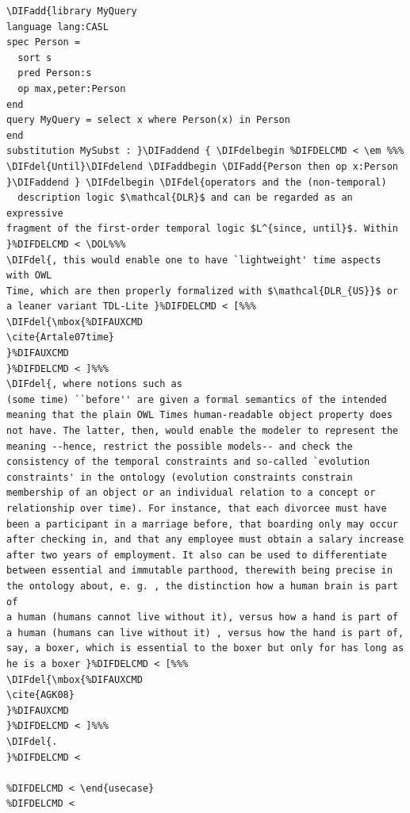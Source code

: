 \documentclass[10pt,fleqn,final]{scrreprt}
\newcommand*{\DOL}{\ensuremath{\mathsf{DOL}}\xspace}
\providecommand{\DIFadd}[1]{{\protect\color{blue}\uwave{#1}}} %
\providecommand{\DIFdel}[1]{{\protect\color{red}\sout{#1}}}                      %
\providecommand{\DIFaddbegin}{} %
\providecommand{\DIFaddend}{} %
\providecommand{\DIFdelbegin}{} %
\providecommand{\DIFdelend}{} %
\begin{document}
\begin{lstlisting}[basicstyle=\ttfamily,language=dolText,alsolanguage=CASL,escapechar=@,mathescape]
%DIF > prefix( lang:  <http://purl.net/DOL/languages/> )%
\DIFadd{library MyQuery
language lang:CASL
spec Person =
  sort s
  pred Person:s 
  op max,peter:Person
end
query MyQuery = select x where Person(x) in Person
end
substitution MySubst : }\DIFaddend { \DIFdelbegin %DIFDELCMD < \em %%%
\DIFdel{Until}\DIFdelend \DIFaddbegin \DIFadd{Person then op x:Person }\DIFaddend } \DIFdelbegin \DIFdel{operators and the (non-temporal)
  description logic $\mathcal{DLR}$ and can be regarded as an expressive
fragment of the first-order temporal logic $L^{since, until}$. Within
}%DIFDELCMD < \DOL%%%
\DIFdel{, this would enable one to have `lightweight' time aspects with OWL
Time, which are then properly formalized with $\mathcal{DLR_{US}}$ or
a leaner variant TDL-Lite }%DIFDELCMD < [%%%
\DIFdel{\mbox{%DIFAUXCMD
\cite{Artale07time}
}%DIFAUXCMD
}%DIFDELCMD < ]%%%
\DIFdel{, where notions such as
(some time) ``before'' are given a formal semantics of the intended
meaning that the plain OWL Times human-readable object property does
not have. The latter, then, would enable the modeler to represent the
meaning --hence, restrict the possible models-- and check the
consistency of the temporal constraints and so-called `evolution
constraints' in the ontology (evolution constraints constrain
membership of an object or an individual relation to a concept or
relationship over time). For instance, that each divorcee must have
been a participant in a marriage before, that boarding only may occur
after checking in, and that any employee must obtain a salary increase
after two years of employment. It also can be used to differentiate
between essential and immutable parthood, therewith being precise in
the ontology about, e. g. , the distinction how a human brain is part of
a human (humans cannot live without it), versus how a hand is part of
a human (humans can live without it) , versus how the hand is part of,
say, a boxer, which is essential to the boxer but only for has long as
he is a boxer }%DIFDELCMD < [%%%
\DIFdel{\mbox{%DIFAUXCMD
\cite{AGK08}
}%DIFAUXCMD
}%DIFDELCMD < ]%%%
\DIFdel{.
}%DIFDELCMD < 

%DIFDELCMD < \end{usecase}
%DIFDELCMD < 


\end{lstlisting}
\end{document}

